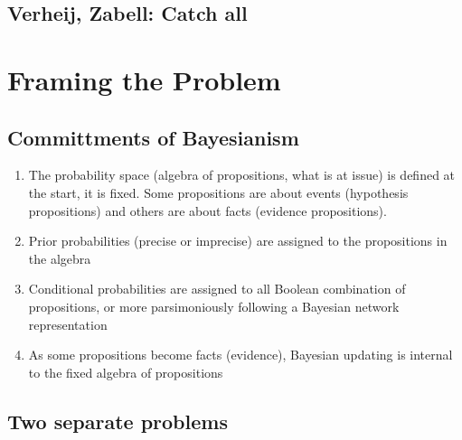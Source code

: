 \documentclass[
  11pt,
  dvipsnames,enabledeprecatedfontcommands]{scrartcl}
\begin{document}
\hypertarget{verheij-zabell-catch-all}{%
\subsection{Verheij, Zabell: Catch all}\label{verheij-zabell-catch-all}}

\hypertarget{framing-the-problem}{%
\section{Framing the Problem}\label{framing-the-problem}}

\hypertarget{committments-of-bayesianism}{%
\subsection{Committments of
Bayesianism}\label{committments-of-bayesianism}}

\begin{enumerate}
\def\labelenumi{\arabic{enumi}.}
\item
  The probability space (algebra of propositions, what is at issue) is
  defined at the start, it is fixed. Some propositions are about events
  (hypothesis propositions) and others are about facts (evidence
  propositions).
\item
  Prior probabilities (precise or imprecise) are assigned to the
  propositions in the algebra
\item
  Conditional probabilities are assigned to all Boolean combination of
  propositions, or more parsimoniously following a Bayesian network
  representation
\item
  As some propositions become facts (evidence), Bayesian updating is
  internal to the fixed algebra of propositions
\end{enumerate}

\hypertarget{two-separate-problems}{%
\subsection{Two separate problems}\label{two-separate-problems}}
\end{document}
